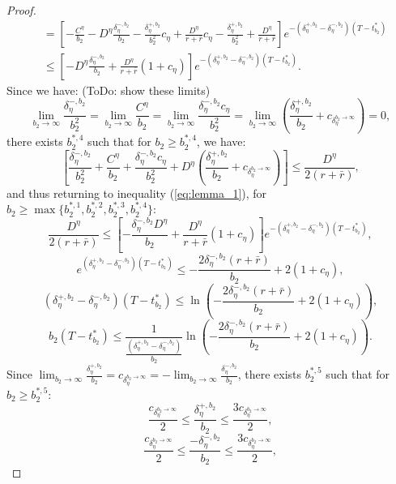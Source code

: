 \documentclass[11pt]{article}
\begin{document}
\begin{proof}
\begin{equation}
\begin{split}
	&= \left[-\frac{C^\eta}{b_2}-D^\eta\frac{\delta^{-,b_2}_\eta}{b_2} -\frac{\delta^{+,b_2}_\eta}{b_2^2}c_\eta +\frac{D^\eta}{r+\bar{r}}c_\eta -\frac{\delta^{+,b_2}_\eta}{b_2^2} +\frac{D^\eta}{r+\bar{r}} \right] e^{-\left(\delta^{+,b_2}_\eta -\delta^{-,b_2}_\eta\right)(T-t^*_{b_2})} \\
	&\leq  \left[-D^\eta\frac{\delta^{-,b_2}_\eta }{b_2}+\frac{D^\eta}{r+\bar{r}}(1+c_\eta) \right] e^{-\left(\delta^{+,b_2}_\eta -\delta^{-,b_2}_\eta\right)(T-t^*_{b_2})}.
	\end{split}
	\label{eq:lemma_1}
	\end{equation}
	Since we have: (ToDo: show these limits)
	$$\lim_{b_2 \to \infty}\frac{\delta^{-,b_2}_\eta}{b_2^2}=\lim_{b_2 \to \infty}\frac{C^\eta}{b_2}=\lim_{b_2 \to \infty}\frac{\delta^{-,b_2}_\eta c_\eta}{b_2^2}=\lim_{b_2 \to \infty}\left(\frac{\delta^{+,b_2}_\eta}{b_2}+c_{\delta^{b_2 \to \infty}_\eta} \right) =0,$$
	there exists $b_2^{*,4}$ such that for $b_2 \geq b_2^{*,4}$, we have:
	$$\left[\frac{\delta^{-,b_2}_\eta}{b_2^2}+\frac{C^\eta}{b_2}+\frac{\delta^{-,b_2}_\eta c_\eta}{b_2^2}+D^\eta \left(\frac{\delta^{+,b_2}_\eta}{b_2}+c_{\delta^{b_2 \to \infty}_\eta} \right)\right] \leq \frac{D^\eta}{2(r+\bar{r})},$$
	and thus returning to inequality (\ref{eq:lemma_1}), for $b_2 \geq \max \{b_2^{*,1},b_2^{*,2},b_2^{*,3},b_2^{*,4} \}$:
	$$\frac{D^\eta}{2(r+\bar{r})}\leq \left[-\frac{\delta^{-,b_2}_\eta D^\eta}{b_2}+\frac{D^\eta}{r+\bar{r}}(1+c_\eta) \right] e^{-\left(\delta^{+,b_2}_\eta -\delta^{-,b_2}_\eta\right)(T-t^*_{b_2})}, $$
	$$e^{\left(\delta^{+,b_2}_\eta -\delta^{-,b_2}_\eta\right)(T-t^*_{b_2})}\leq -\frac{2\delta^{-,b_2}_\eta(r+\bar{r})}{b_2}+2(1+c_\eta) , $$
	$$\left(\delta^{+,b_2}_\eta -\delta^{-,b_2}_\eta\right)(T-t^*_{b_2})\leq \ln \left( -\frac{2\delta^{-,b_2}_\eta(r+\bar{r})}{b_2}+2(1+c_\eta) \right) , $$
	\begin{equation}
	b_2(T-t^*_{b_2})\leq \frac{1}{\frac{\left(\delta^{+,b_2}_\eta -\delta^{-,b_2}_\eta\right)}{b_2}} \ln \left( -\frac{2\delta^{-,b_2}_\eta(r+\bar{r})}{b_2}+2(1+c_\eta) \right).
	\label{eq:lemma_2}
	\end{equation}
	Since $\lim_{b_2 \to \infty}\frac{\delta^{+,b_2}_\eta}{b_2}=c_{\delta_\eta^{b_2 \to \infty}}=-\lim_{b_2 \to \infty}\frac{\delta^{-,b_2}_\eta}{b_2}$, there exists $b_2^{*,5}$ such that for $b_2 \geq b_2^{*,5}$:
	$$\frac{c_{\delta_\eta^{b_2 \to \infty}}}{2} \leq \frac{\delta^{+,b_2}_\eta}{b_2} \leq \frac{3c_{\delta_\eta^{b_2 \to \infty}}}{2}, $$
	$$\frac{c_{\delta_\eta^{b_2 \to \infty}}}{2} \leq \frac{-\delta^{-,b_2}_\eta}{b_2} \leq \frac{3c_{\delta_\eta^{b_2 \to \infty}}}{2},$$

\end{proof}
\end{document}
